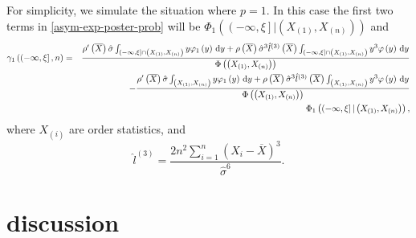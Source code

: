 For simplicity, we simulate the situation where $p=1$. In this case
the first two terms in \eqref{asym-exp-poster-prob} will be $\Phi_{1}\left(\left(-\infty,\xi\right]|\left(X_{\left(1\right)},X_{\left(n\right)}\right)\right)$
and 
\begin{eqnarray*}
\gamma_{1}\left(\left(-\infty,\xi\right],n\right) & = & \frac{\rho'\left(\overline{X}\right)\hat{\sigma}\int_{\left(-\infty,\xi\right]\cap\left(X_{\left(1\right)},X_{\left(n\right)}\right)}y\varphi_{1}\left(y\right)\,\mathrm{d} y+\rho\left(\overline{X}\right)\hat{\sigma}^{3}\hat{l}^{\left(3\right)}\left(\overline{X}\right)\int_{\left(-\infty,\xi\right]\cap\left(X_{\left(1\right)},X_{\left(n\right)}\right)}y^{3}\varphi\left(y\right)\,\mathrm{d} y}{\Phi\left(\left(X_{\left(1\right)},X_{\left(n\right)}\right)\right)}\\
 &  & -\frac{\rho'\left(\overline{X}\right)\hat{\sigma}\int_{\left(X_{\left(1\right)},X_{\left(n\right)}\right)}y\varphi_{1}\left(y\right)\,\mathrm{d} y+\rho\left(\overline{X}\right)\hat{\sigma}^{3}\hat{l}^{\left(3\right)}\left(\overline{X}\right)\int_{\left(X_{\left(1\right)},X_{\left(n\right)}\right)}y^{3}\varphi\left(y\right)\,\mathrm{d} y}{\Phi\left(\left(X_{\left(1\right)},X_{\left(n\right)}\right)\right)}\\
 &  & \Phi_{1}\left(\left(-\infty,\xi\right]|\left(X_{\left(1\right)},X_{\left(n\right)}\right)\right),
\end{eqnarray*}
where $X_{\left(i\right)}$ are order statistics, and 
\[
\hat{l}^{\left(3\right)}=\frac{2n^{2}\sum_{i=1}^{n}\left(X_{i}-\overline{X}\right)^{3}}{\hat{\sigma}^{6}}.
\]



\section{discussion\label{sec:discussion}}

